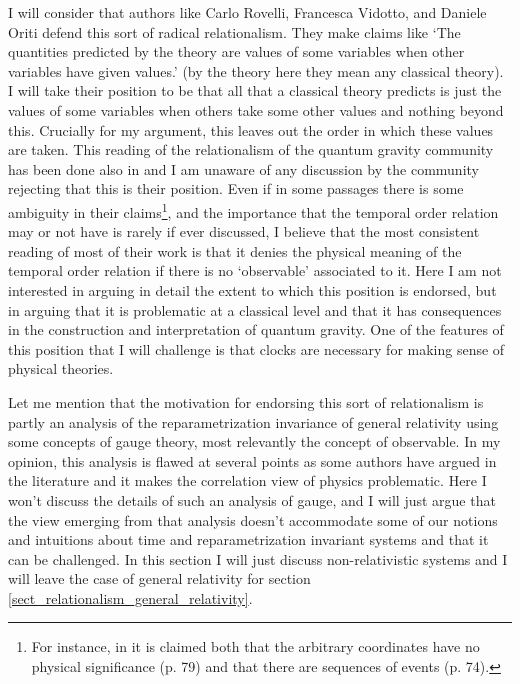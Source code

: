\documentclass[12 pt]{article}
\begin{document}
I will consider that authors like Carlo Rovelli, Francesca Vidotto, and Daniele Oriti \citep{Rovelli1991,Rovelli1996,Rovelli2002,Rovelli2004,Rovelli2011,Rovelli2015,Vidotto2017,Rovelli2022,Oriti2021a,Oriti2021,Marchetti2021}  defend this sort of radical relationalism. They make claims like `The quantities predicted by the theory are values of some variables when other variables have given values.' \citep[p. 21]{Rovelli2022} (by the theory here they mean any classical theory). I will take their position to be that all that a classical theory predicts is just the values of some variables when others take some other values and nothing beyond this. Crucially for my argument, this leaves out the order in which these values are taken. This reading of the relationalism of the quantum gravity community has been done also in \citep{Thebault2012,Thebault2021} and I am unaware of any discussion by the community rejecting that this is their position. Even if in some passages there is some ambiguity in their claims\footnote{For instance, in \citep{Rovelli2004} it is claimed both that the arbitrary coordinates have no physical significance (p. 79) and that there are sequences of events (p. 74).}, and the importance that the temporal order relation may or not have is rarely if ever discussed, I believe that the most consistent reading of most of their work is that it denies the physical meaning of the temporal order relation if there is no `observable' associated to it. Here I am not interested in arguing in detail the extent to which this position is endorsed, but in arguing that it is problematic at a classical level and that it has consequences in the construction and interpretation of quantum gravity. One of the features of this position that I will challenge is that clocks are necessary for making sense of physical theories.

Let me mention that the motivation for endorsing this sort of relationalism is partly an analysis of the reparametrization invariance of general relativity using some concepts of gauge theory, most relevantly the concept of observable. In my opinion, this analysis is flawed at several points as some authors have argued in the literature \citep{Maudlin2002,Pitts2014-PITCIH,Pitts2017,MozotaFrauca2023} and it makes the correlation view of physics problematic. Here I won't discuss the details of such an analysis of gauge, and I will just argue that the view emerging from that analysis doesn't accommodate some of our notions and intuitions about time and reparametrization invariant systems and that it can be challenged. In this section I will just discuss non-relativistic systems and I will leave the case of general relativity for section \ref{sect_relationalism_general_relativity}.
\end{document}
